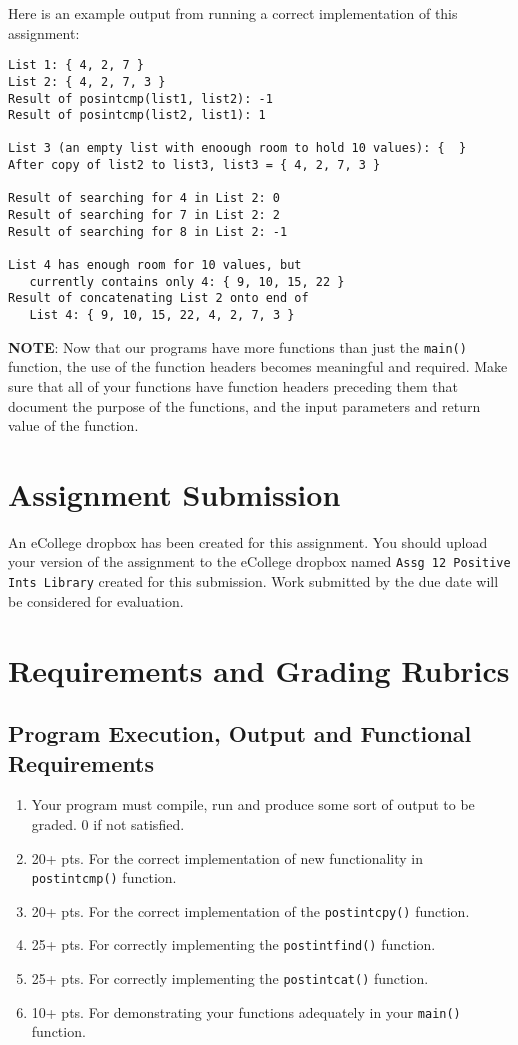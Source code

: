 \documentclass[11pt]{article}
\begin{document}
Here is an example output from running a correct implementation of
this assignment:

\begin{verbatim}
List 1: { 4, 2, 7 }
List 2: { 4, 2, 7, 3 }
Result of posintcmp(list1, list2): -1
Result of posintcmp(list2, list1): 1

List 3 (an empty list with enoough room to hold 10 values): {  }
After copy of list2 to list3, list3 = { 4, 2, 7, 3 }

Result of searching for 4 in List 2: 0
Result of searching for 7 in List 2: 2
Result of searching for 8 in List 2: -1

List 4 has enough room for 10 values, but 
   currently contains only 4: { 9, 10, 15, 22 }
Result of concatenating List 2 onto end of 
   List 4: { 9, 10, 15, 22, 4, 2, 7, 3 }
\end{verbatim}

\textbf{NOTE}: Now that our programs have more functions than just the
\verb~main()~ function, the use of the function headers becomes meaningful
and required.  Make sure that all of your functions have function
headers preceding them that document the purpose of the functions, and
the input parameters and return value of the function.
\section*{Assignment Submission}
\label{sec-4}

An eCollege dropbox has been created for this assignment.  You should
upload your version of the assignment to the eCollege dropbox named
\verb~Assg 12 Positive Ints Library~ created for this submission.  Work
submitted by the due date will be considered for evaluation.
\section*{Requirements and Grading Rubrics}
\label{sec-5}

\subsection*{Program Execution, Output and Functional Requirements}
\label{sec-5-1}

\begin{enumerate}
\item Your program must compile, run and produce some sort of output to
be graded. 0 if not satisfied.
\item 20+ pts. For the correct implementation of new functionality in \verb~postintcmp()~
function.
\item 20+ pts. For the correct implementation of the \verb~postintcpy()~ function.
\item 25+ pts. For correctly implementing the \verb~postintfind()~ function.
\item 25+ pts. For correctly implementing the \verb~postintcat()~ function.
\item 10+ pts. For demonstrating your functions adequately in your \verb~main()~ function.
\end{enumerate}
\end{document}
